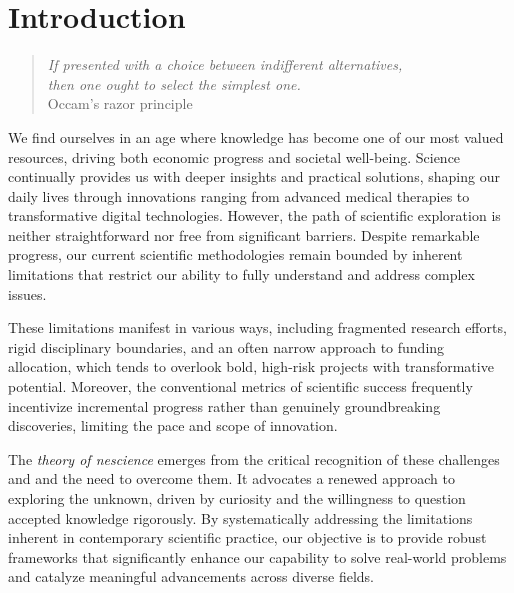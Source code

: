 %
%


\chapter{Introduction}
\label{chap:Introduction}

\begin{quote}
\begin{flushright}
\emph{If presented with a choice between indifferent alternatives,\\
then one ought to select the simplest one.}\\
Occam's razor principle 
\end{flushright}
\end{quote}
\bigskip

We find ourselves in an age where knowledge has become one of our most valued resources, driving both economic progress and societal well-being. Science continually provides us with deeper insights and practical solutions, shaping our daily lives through innovations ranging from advanced medical therapies to transformative digital technologies. However, the path of scientific exploration is neither straightforward nor free from significant barriers. Despite remarkable progress, our current scientific methodologies remain bounded by inherent limitations that restrict our ability to fully understand and address complex issues.

These limitations manifest in various ways, including fragmented research efforts, rigid disciplinary boundaries, and an often narrow approach to funding allocation, which tends to overlook bold, high-risk projects with transformative potential. Moreover, the conventional metrics of scientific success frequently incentivize incremental progress rather than genuinely groundbreaking discoveries, limiting the pace and scope of innovation.

The \emph{theory of nescience} emerges from the critical recognition of these challenges and and the need to overcome them. It advocates a renewed approach to exploring the unknown, driven by curiosity and the willingness to question accepted knowledge rigorously. By systematically addressing the limitations inherent in contemporary scientific practice, our objective is to provide robust frameworks that significantly enhance our capability to solve real-world problems and catalyze meaningful advancements across diverse fields.

